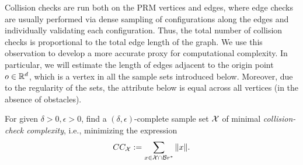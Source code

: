 Collision checks are run both on the PRM vertices and edges, where edge checks are usually performed via dense sampling of configurations along the edges and individually validating each configuration. Thus, the total number of collision checks is proportional to the total edge length of the graph. We use this observation to develop a more accurate proxy for computational complexity. In particular, we will estimate the length of edges adjacent to the origin point $o \in \mathbb{R}^d$, which is a vertex in all the sample sets introduced below. Moreover, due to the regularity of the sets, the attribute below is equal across all vertices (in the absence of obstacles).

\begin{problem}\label{problem:collision}
  For given \mbox{$\delta>0,\epsilon>0$}, find a $(\delta,\epsilon)$-complete sample set $\mathcal{X}$ of  minimal \emph{collision-check complexity}, i.e., minimizing the expression
  \[
      CC_{\mathcal{X}}:=\sum_{x\in \mathcal{X}\cap \mathcal{B}{r^*}} \|x\|.
  \]
\end{problem}





